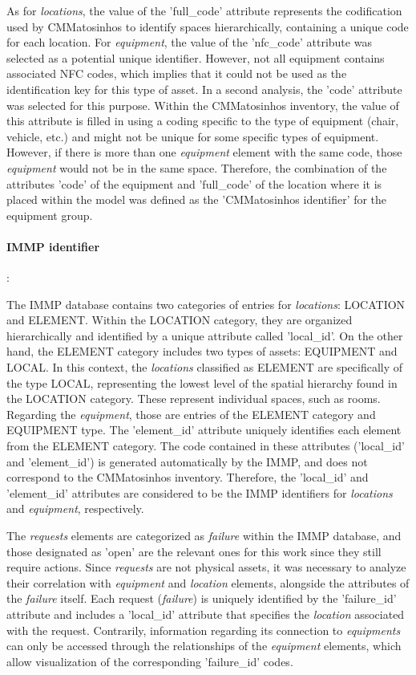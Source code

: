 \documentclass[a4paper, 10pt, twocolumn, twoside]{article}
\begin{document}
As for \emph{locations}, the value of the 'full\_code' attribute represents the codification used by CMMatosinhos to identify spaces hierarchically, containing a unique code for each location. For \emph{equipment}, the value of the 'nfc\_code' attribute was selected as a potential unique identifier. However, not all equipment contains associated NFC codes, which implies that it could not be used as the identification key for this type of asset. In a second analysis, the 'code' attribute was selected for this purpose. Within the CMMatosinhos inventory, the value of this attribute is filled in using a coding specific to the type of equipment (chair, vehicle, etc.) and might not be unique for some specific types of equipment. However, if there is more than one \emph{equipment} element with the same code, those \emph{equipment} would not be in the same space. Therefore, the combination of the attributes 'code' of the equipment and 'full\_code' of the location where it is placed within the model was defined as the 'CMMatosinhos identifier' for the equipment group.

\paragraph{IMMP identifier}:

The IMMP database contains two categories of entries for \emph{locations}: LOCATION and ELEMENT. Within the LOCATION category, they are organized hierarchically and identified by a unique attribute called 'local\_id'. On the other hand, the ELEMENT category includes two types of assets: EQUIPMENT and LOCAL. In this context, the \emph{locations} classified as ELEMENT are specifically of the type LOCAL, representing the lowest level of the spatial hierarchy found in the LOCATION category. These represent individual spaces, such as rooms. Regarding the \emph{equipment}, those are entries of the ELEMENT category and EQUIPMENT type. The 'element\_id' attribute uniquely identifies each element from the ELEMENT category. The code contained in these attributes ('local\_id' and 'element\_id') is generated automatically by the IMMP, and does not correspond to the CMMatosinhos inventory. Therefore, the 'local\_id' and 'element\_id' attributes are considered to be the IMMP identifiers for \emph{locations} and \emph{equipment}, respectively.

The \emph{requests} elements are categorized as \emph{failure} within the IMMP database, and those designated as 'open' are the relevant ones for this work since they still require actions. Since \emph{requests} are not physical assets, it was necessary to analyze their correlation with \emph{equipment} and \emph{location} elements, alongside the attributes of the \emph{failure} itself. Each request (\emph{failure}) is uniquely identified by the 'failure\_id' attribute and includes a 'local\_id' attribute that specifies the \emph{location} associated with the request. Contrarily, information regarding its connection to \emph{equipments} can only be accessed through the relationships of the \emph{equipment} elements, which allow visualization of the corresponding 'failure\_id' codes.
\end{document}
